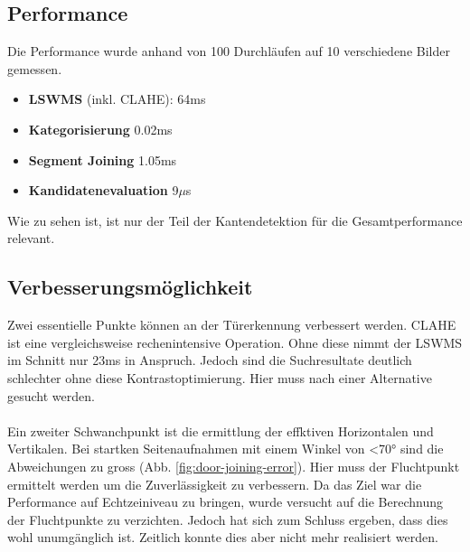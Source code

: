 \subsection{Performance}
Die Performance wurde anhand von 100 Durchläufen auf 10 verschiedene Bilder gemessen.

\begin{itemize}
	\item \textbf{LSWMS} (inkl. CLAHE): 64ms
	\item \textbf{Kategorisierung} 0.02ms
	\item \textbf{Segment Joining} 1.05ms
	\item \textbf{Kandidatenevaluation} 9$\mu$s
\end{itemize}

\noindent
Wie zu sehen ist, ist nur der Teil der Kantendetektion für die Gesamtperformance relevant. 

\subsection{Verbesserungsmöglichkeit}
Zwei essentielle Punkte können an der Türerkennung verbessert werden. CLAHE ist eine vergleichsweise rechenintensive Operation. Ohne diese nimmt der LSWMS im Schnitt nur 23ms in Anspruch. Jedoch sind die Suchresultate deutlich schlechter ohne diese Kontrastoptimierung. Hier muss nach einer Alternative gesucht werden.
\paragraph{}
Ein zweiter Schwanchpunkt ist die ermittlung der effktiven Horizontalen und Vertikalen. Bei startken Seitenaufnahmen mit einem Winkel von <70° sind die Abweichungen zu gross (Abb. \ref{fig:door-joining-error}). Hier muss der Fluchtpunkt ermittelt werden um die Zuverlässigkeit zu verbessern. Da das Ziel war die Performance auf Echtzeiniveau zu bringen, wurde versucht auf die Berechnung der Fluchtpunkte zu verzichten. Jedoch hat sich zum Schluss ergeben, dass dies wohl unumgänglich ist. Zeitlich konnte dies aber nicht mehr realisiert werden.

